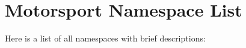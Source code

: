 \section{Motorsport Namespace List}
Here is a list of all namespaces with brief descriptions:\begin{CompactList}
\item{}
\end{CompactList}
